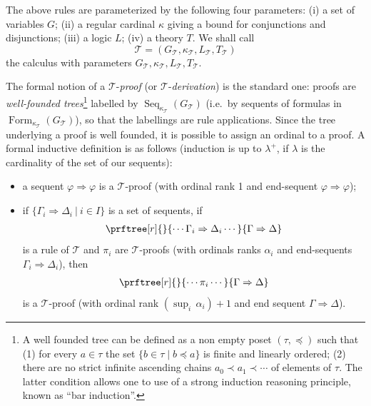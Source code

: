 \documentclass{article}
\theoremstyle{definition}
\DeclareMathOperator{\Formulas}{Form}
\DeclareMathOperator{\Seq}{Seq}
\begin{document}
The above rules are parameterized by the following four parameters: (i) a set of variables $G$; (ii)  a regular cardinal $\kappa$ giving a  bound for conjunctions and disjunctions; (iii) a logic $L$; (iv) a theory $T$.
We shall call 
$$
\mathcal{T}
= (G_\mathcal{T},\kappa_\mathcal{T}, L_\mathcal{T},T_\mathcal{T})
$$
the calculus with parameters
$G_\mathcal{T},\kappa_\mathcal{T}, L_\mathcal{T},T_\mathcal{T}$.

The formal notion of a $\mathcal{T}$-\emph{proof} (or  $\mathcal{T}$-\emph{derivation}) is the standard one: proofs are \emph{well-founded trees}\footnote{A well founded tree can be defined as a non empty 
poset
$(\tau, \preccurlyeq)$ such that (1) for every $a \in \tau$ the set $\{b\in \tau \mid b \preccurlyeq a\} $ is finite and linearly ordered; (2) there are no strict infinite ascending chains $a_0\prec a_1\prec \cdots$ of elements of $\tau$. The latter condition allows one to  use of a strong induction reasoning principle, known as ``bar induction''.} labelled by $\Seq_{\kappa_\mathcal{T}}(G_\mathcal{T})$ (i.e.\ by sequents of formulas in $\Formulas_{\kappa_\mathcal{T}}(G_\mathcal{T})$), so that the labellings are rule applications. Since the tree underlying a proof is well founded, it is possible to assign an ordinal to a proof. A formal inductive definition is as follows (induction is up to $\lambda^+$, if $\lambda$ is the cardinality of the set of our sequents):
\begin{itemize}
 \item a sequent $\varphi\Rightarrow \varphi$ is a $\mathcal{T}$-proof (with  ordinal rank 1 and end-sequent $\varphi\Rightarrow \varphi$);
 \item if $\{\Gamma_i\Rightarrow \Delta_i\ \vert\ i \in I\}$ is a set of sequents, if
 \begin{align*}
\prftree[r]{\scriptsize }
{\cdots \Gamma_i \Rightarrow \Delta_i\cdots }
{\Gamma \Rightarrow \Delta}
\end{align*}
 is a rule of $\mathcal{T}$ and 
  $\pi_i$ are $\mathcal{T}$-proofs (with ordinals ranks $\alpha_i$ and end-sequents $\Gamma_i\Rightarrow \Delta_i$), then 
  \begin{align*}
\prftree[r]{\scriptsize }
{\cdots \pi_i\cdots }
{\Gamma \Rightarrow \Delta}
\end{align*}
is a $\mathcal{T}$-proof (with ordinal rank $(\sup_i \,\alpha_i)+1$
and end sequent $\Gamma \Rightarrow \Delta$).
\end{itemize}
\end{document}
